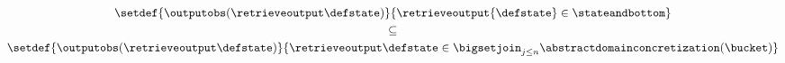 \begin{gather*}
\setdef{\outputobs(\retrieveoutput\defstate)}{\retrieveoutput{\defstate} \in \stateandbottom} \\
\subseteq \\
\setdef{\outputobs(\retrieveoutput\defstate)}{\retrieveoutput\defstate\in\bigsetjoin_{j\le n}\abstractdomainconcretization(\bucket)}
\end{gather*}
